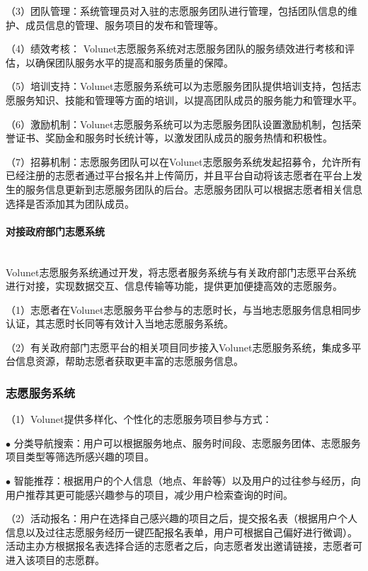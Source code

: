 （3）团队管理：系统管理员对入驻的志愿服务团队进行管理，包括团队信息的维护、成员信息的管理、服务项目的发布和管理等。

（4）绩效考核： Volunet志愿服务系统对志愿服务团队的服务绩效进行考核和评估，以确保团队服务水平的提高和服务质量的保障。

（5）培训支持：Volunet志愿服务系统可以为志愿服务团队提供培训支持，包括志愿服务知识、技能和管理等方面的培训，以提高团队成员的服务能力和管理水平。

（6）激励机制：Volunet志愿服务系统可以为志愿服务团队设置激励机制，包括荣誉证书、奖励金和服务时长统计等，以激发团队成员的服务热情和积极性。

（7）招募机制：志愿服务团队可以在Volunet志愿服务系统发起招募令，允许所有已经注册的志愿者通过平台报名并上传简历，并且平台自动将该志愿者在平台上发生的服务信息更新到志愿服务团队的后台。志愿服务团队可以根据志愿者相关信息选择是否添加其为团队成员。


\paragraph{对接政府部门志愿系统}~{}
\\

Volunet志愿服务系统通过开发，将志愿者服务系统与有关政府部门志愿平台系统进行对接，实现数据交互、信息传输等功能，提供更加便捷高效的志愿服务。

（1）志愿者在Volunet志愿服务平台参与的志愿时长，与当地志愿服务信息相同步认证，其志愿时长同等有效计入当地志愿服务系统。

（2）有关政府部门志愿平台的相关项目同步接入Volunet志愿服务系统，集成多平台信息资源，帮助志愿者获取更丰富的志愿服务信息。


\subsubsection{志愿服务系统}

（1）Volunet提供多样化、个性化的志愿服务项目参与方式：

$\bullet$ 分类导航搜索：用户可以根据服务地点、服务时间段、志愿服务团体、志愿服务项目类型等筛选所感兴趣的项目。

$\bullet$ 智能推荐：根据用户的个人信息（地点、年龄等）以及用户的过往参与经历，向用户推荐其更可能感兴趣参与的项目，减少用户检索查询的时间。

（2）活动报名：用户在选择自己感兴趣的项目之后，提交报名表（根据用户个人信息以及过往志愿服务经历一键匹配报名表单，用户可根据自己偏好进行微调）。活动主办方根据报名表选择合适的志愿者之后，向志愿者发出邀请链接，志愿者可进入该项目的志愿群。

